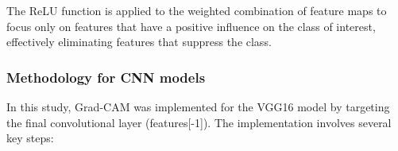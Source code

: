 \documentclass[a4paper,12pt]{report}
\begin{document}

The ReLU function is applied to the weighted combination of feature maps to focus only on features that have a positive influence on the class of interest, effectively eliminating features that suppress the class.

\subsubsection{Methodology for CNN models}

In this study, Grad-CAM was implemented for the VGG16 model by targeting the final convolutional layer (features[-1]). The implementation involves several key steps:
\end{document}
